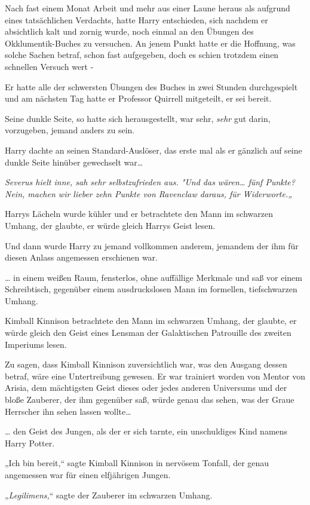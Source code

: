 {Nach fast einem Monat Arbeit und mehr aus einer Laune heraus als aufgrund eines tatsächlichen Verdachts, hatte Harry entschieden, sich nachdem er absichtlich kalt und zornig wurde, noch einmal an den Übungen des Okklumentik-Buches zu versuchen. An jenem Punkt hatte er die Hoffnung, was solche Sachen betraf, schon fast aufgegeben, doch es schien trotzdem einen schnellen Versuch wert -

Er hatte alle der schwersten Übungen des Buches in zwei Stunden durchgespielt und am nächsten Tag hatte er Professor Quirrell mitgeteilt, er sei bereit.

Seine dunkle Seite, so hatte sich herausgestellt, war sehr, \emph{sehr} gut darin, vorzugeben, jemand anders zu sein.

Harry dachte an seinen Standard-Auslöser, das erste mal als er gänzlich auf seine dunkle Seite hinüber gewechselt war…

\emph{Severus hielt inne, sah sehr selbstzufrieden aus. "Und das wären… fünf Punkte? Nein, machen wir lieber zehn Punkte von Ravenclaw daraus, für Widerworte.„}

Harrys Lächeln wurde kühler und er betrachtete den Mann im schwarzen Umhang, der glaubte, er würde gleich Harrys Geist lesen.

Und dann wurde Harry zu jemand vollkommen anderem, jemandem der ihm für diesen Anlass angemessen erschienen war.

… in einem weißen Raum, fensterlos, ohne auffällige Merkmale und saß vor einem Schreibtisch, gegenüber einem ausdruckslosen Mann im formellen, tiefschwarzen Umhang.

Kimball Kinnison betrachtete den Mann im schwarzen Umhang, der glaubte, er würde gleich den Geist eines Lensman der Galaktischen Patrouille des zweiten Imperiums lesen.

Zu sagen, dass Kimball Kinnison zuversichtlich war, was den Ausgang dessen betraf, wäre eine Untertreibung gewesen. Er war trainiert worden von Mentor von Arisia, dem mächtigsten Geist dieses oder jedes anderen Universums und der bloße Zauberer, der ihm gegenüber saß, würde genau das sehen, was der Graue Herrscher ihn sehen lassen wollte…

… den Geist des Jungen, als der er sich tarnte, ein unschuldiges Kind namens Harry Potter.

„Ich bin bereit,“ sagte Kimball Kinnison in nervösem Tonfall, der genau angemessen war für einen elfjährigen Jungen.

„\emph{Legilimens,}“ sagte der Zauberer im schwarzen Umhang.

}
